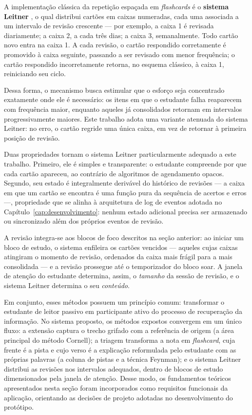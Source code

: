 \documentclass[12pt, %
openright, 
oneside,
a4paper,
english,   %
brazil]{facom-ufu-abntex2}
\begin{document}
\label{sec:leitner}%
A implementação clássica da repetição espaçada em \textit{flashcards} é o
\textbf{sistema Leitner} \cite{Leitner1972}, o qual distribui cartões em
caixas numeradas, cada uma associada a um intervalo de revisão crescente ---
por exemplo, a caixa 1 é revisada diariamente; a caixa 2, a cada três dias; a
caixa 3, semanalmente. Todo cartão novo entra na caixa 1. A cada revisão, o
cartão respondido corretamente é promovido à caixa seguinte, passando a ser
revisado com menor frequência; o cartão respondido incorretamente retorna, no
esquema clássico, à caixa 1, reiniciando seu ciclo.

Dessa forma, o mecanismo busca estimular que o esforço seja concentrado
exatamente onde ele é necessário: os itens em que o estudante falha reaparecem
com frequência maior, enquanto aqueles já consolidados retornam em intervalos
progressivamente maiores. Este trabalho adota uma variante atenuada do sistema
Leitner: no erro, o cartão regride uma única
caixa, em vez de retornar à primeira posição de revisão.

Duas propriedades tornam o sistema Leitner particularmente adequado a este
trabalho. Primeiro, ele é simples e transparente: o estudante compreende por
que cada cartão apareceu, ao contrário de algoritmos de agendamento opacos.
Segundo, seu estado é integralmente derivável do histórico de revisões --- a
caixa em que um cartão se encontra é uma função pura da sequência de acertos e
erros ---, propriedade que se alinha à arquitetura de log de eventos adotada
no Capítulo~\ref{cap:desenvolvimento}: nenhum estado adicional precisa ser
armazenado ou sincronizado além dos próprios eventos de revisão.

A revisão integra-se aos blocos de foco descritos na seção anterior: ao iniciar
um bloco de estudo, o sistema enfileira os cartões vencidos --- aqueles cujas
caixas atingiram o momento de revisão, ordenados da caixa mais frágil para a
mais consolidada --- e a revisão prossegue até o temporizador do bloco soar. A
janela de atenção do estudante determina, assim, o \emph{tamanho} da sessão de
revisão, e o sistema Leitner determina o seu \emph{conteúdo}.

Em conjunto, esses métodos possuem um princípio comum: transformar o
estudante de leitor passivo em participante ativo do processo de recuperação
da informação. No sistema proposto, os métodos expostos convergem em um único
fluxo: a extensão captura o trecho grifado com a referência de origem (a área
principal do método Cornell); a triagem transforma a nota em
\textit{flashcard}, cuja frente é a pista e cujo verso é a explicação
reformulada pelo estudante com as próprias palavras (a coluna de pistas e a
técnica Feynman); e o sistema Leitner distribui as revisões nos intervalos
adequados, dentro de blocos de estudo dimensionados pela janela de atenção.
Desse modo, os fundamentos teóricos apresentados nesta seção foram
incorporados como requisitos funcionais da aplicação, orientando as decisões
de projeto adotadas no desenvolvimento do protótipo.
\end{document}
